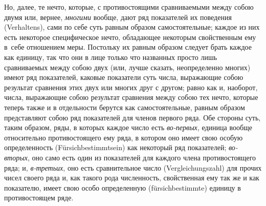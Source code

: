 Но, далее, те нечто, которые, с противостоящими сравниваемыми между собою двумя
или, вернее, {\em многими} вообще, дают ряд показателей их поведения
(Ver\-hal\-tens), сами по себе суть равным образом самостоятельные; каждое из
них есть некоторое специфическое нечто, обладающее некоторым свойственным ему
в~себе отношением меры. Постольку их равным образом следует брать каждое как
единицу, так что они в лице только что названных просто лишь сравниваемых между
собою двух (или, лучше сказать, неопределенно многих) имеют ряд показателей,
каковые показатели суть числа, выражающие собою результат сравнения этих двух
или многих друг с другом; равно как и, наоборот, числа, выражающие собою
результат сравнения между собою тех нечто, которые теперь также и в отдельности
берутся как самостоятельные, равным образом представляют собою ряд показателей
для членов первого ряда. Обе стороны суть, таким образом, ряды, в которых
каждое число есть {\em во-первых}, единица вообще относительно противостоящего
ему ряда, в котором оно имеет свою особую определенность
(Für\-sich\-bes\-timmt\-sein) как некоторый ряд показателей; {\em во-вторых},
оно само есть один из показателей для каждого члена противостоящего ряда; и,
{\em в-третьих}, оно есть сравнительное число (Ver\-gleich\-ungs\-zahl) для
прочих чисел своего ряда и, как такого рода численность, свойственная ему так
же и как показателю, имеет свою особо определенную (für\-sich\-bes\-timmte)
единицу в противостоящем ряде.

